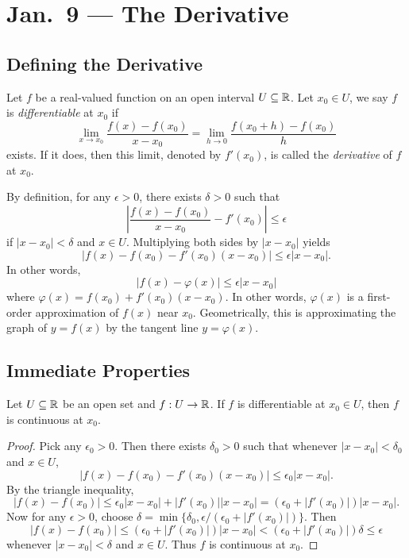 \chapter{Jan.~9 --- The Derivative}

\section{Defining the Derivative}
\begin{definition}
  Let $f$ be a real-valued function on an open interval
  $U \subseteq \mathbb{R}$. Let $x_0 \in U$, we say $f$ is
  \emph{differentiable} at $x_0$ if
  \[
    \lim_{x \to x_0} \frac{f(x) - f(x_0)}{x - x_0}
    = \lim_{h \to 0} \frac{f(x_0 + h) - f(x_0)}{h}
  \]
  exists. If it does, then this limit, denoted by
  $f'(x_0)$, is called the \emph{derivative} of $f$ at
  $x_0$.
\end{definition}

\begin{remark}
By definition, for any $\epsilon > 0$, there exists
$\delta > 0$ such that
\[
  \left|\frac{f(x) - f(x_0)}{x - x_0} - f'(x_0)\right| \le \epsilon
\]
if $|x - x_0| < \delta$ and $x \in U$. Multiplying
both sides by $|x - x_0|$ yields
\[
  |f(x) - f(x_0) - f'(x_0)(x - x_0)| \le \epsilon |x - x_0|.
\]
In other words,
\[|f(x) - \varphi(x)| \le \epsilon |x - x_0|\]
where $\varphi(x) = f(x_0) + f'(x_0)(x - x_0)$.
In other words, $\varphi(x)$ is a first-order
approximation of $f(x)$ near $x_0$.
Geometrically, this is approximating the graph of
$y = f(x)$ by the tangent line $y = \varphi(x)$.
\end{remark}

\section{Immediate Properties}
\begin{prop}
  Let $U \subseteq \mathbb{R}$ be an open set and $ f : U \to \mathbb{R}$.
  If $f$ is differentiable at $x_0 \in U$, then
  $f$ is continuous at $x_0$.
\end{prop}

\begin{proof}
  Pick any $\epsilon_0 > 0$. Then there exists
  $\delta_0 > 0$ such that whenever
  $|x - x_0| < \delta_0$ and $x \in U$,
  \[|f(x) - f(x_0) - f'(x_0)(x - x_0)| \le \epsilon_0 |x - x_0|.\]
  By the triangle inequality,
  \[
    |f(x) - f(x_0)| \le \epsilon_0 |x - x_0| + |f'(x_0)| |x - x_0| = (\epsilon_0 + |f'(x_0)|) |x - x_0|.
  \]
  Now for any $\epsilon > 0$, choose
  $\delta = \min\{\delta_0, \epsilon / (\epsilon_0 + |f'(x_0)|)\}$.
  Then
  \[
    |f(x) - f(x_0)| \le (\epsilon_0 + |f'(x_0)|) |x - x_0| < (\epsilon_0 + |f'(x_0)|) \delta \le \epsilon
  \]
  whenever $|x - x_0| < \delta$ and $x \in U$.
  Thus $f$ is continuous at $x_0$.
\end{proof}

